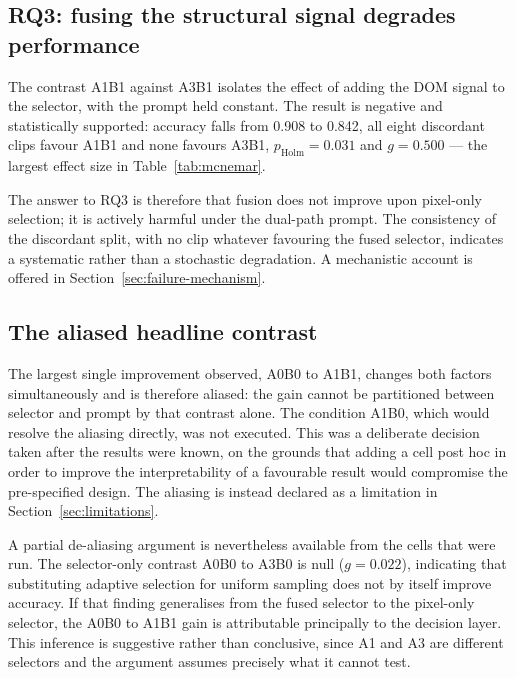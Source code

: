 \subsection{RQ3: fusing the structural signal degrades performance}
\label{sec:attr-harm}

The contrast A1B1 against A3B1 isolates the effect of adding the DOM
signal to the selector, with the prompt held constant. The result is
negative and statistically supported: accuracy falls from 0.908 to 0.842,
all eight discordant clips favour A1B1 and none favours A3B1,
$p_{\text{Holm}} = 0.031$ and $g = 0.500$ --- the largest effect size in
Table~\ref{tab:mcnemar}.

The answer to RQ3 is therefore that fusion does not improve upon
pixel-only selection; it is actively harmful under the dual-path prompt.
The consistency of the discordant split, with no clip whatever favouring
the fused selector, indicates a systematic rather than a stochastic
degradation. A mechanistic account is offered in
Section~\ref{sec:failure-mechanism}.

\subsection{The aliased headline contrast}
\label{sec:attr-alias}

The largest single improvement observed, A0B0 to A1B1, changes both
factors simultaneously and is therefore aliased: the gain cannot be
partitioned between selector and prompt by that contrast alone. The
condition A1B0, which would resolve the aliasing directly, was not
executed. This was a deliberate decision taken after the results were
known, on the grounds that adding a cell post hoc in order to improve the
interpretability of a favourable result would compromise the pre-specified
design. The aliasing is instead declared as a limitation in
Section~\ref{sec:limitations}.

A partial de-aliasing argument is nevertheless available from the cells
that were run. The selector-only contrast A0B0 to A3B0 is null
($g = 0.022$), indicating that substituting adaptive selection for uniform
sampling does not by itself improve accuracy. If that finding generalises
from the fused selector to the pixel-only selector, the A0B0 to A1B1 gain
is attributable principally to the decision layer. This inference is
suggestive rather than conclusive, since A1 and A3 are different selectors
and the argument assumes precisely what it cannot test.


